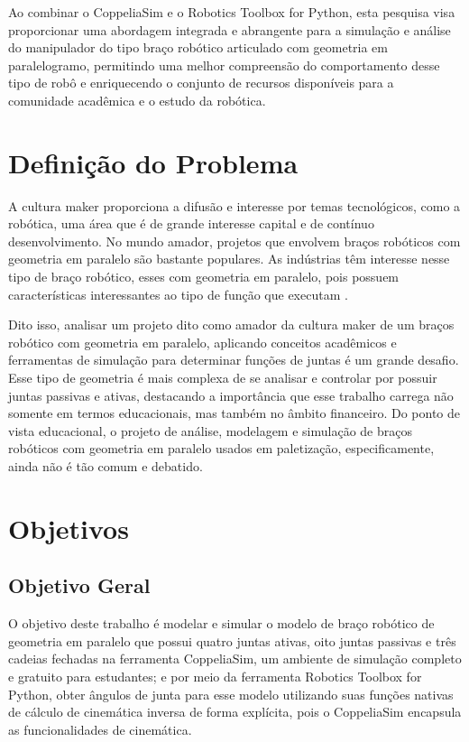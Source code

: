 Ao combinar o CoppeliaSim e o Robotics Toolbox for Python, esta pesquisa visa proporcionar uma abordagem integrada e abrangente para a simulação e análise do manipulador do tipo braço robótico articulado com geometria em paralelogramo,  permitindo uma melhor compreensão do comportamento desse tipo de robô e enriquecendo o conjunto de recursos disponíveis para a comunidade acadêmica e o estudo da robótica.

\section{Definição do Problema}

A cultura maker proporciona a difusão e interesse por temas tecnológicos, como a robótica, uma área que é de grande interesse capital e de contínuo desenvolvimento. No mundo amador, projetos que envolvem braços robóticos com geometria em paralelo são bastante populares. As indústrias têm interesse nesse tipo de braço robótico, esses com geometria em paralelo, pois possuem características interessantes ao tipo de função que executam \cite{Siciliano2009}.

Dito isso, analisar um projeto dito como amador da cultura maker de um braços robótico com geometria em paralelo, aplicando conceitos acadêmicos e ferramentas de simulação para determinar funções de juntas é um grande desafio. Esse tipo de geometria é mais complexa de se analisar e controlar por possuir juntas passivas e ativas, destacando a importância que esse trabalho carrega não somente em termos educacionais, mas também no âmbito financeiro. Do ponto de vista educacional, o projeto de análise, modelagem e simulação de braços robóticos com geometria em paralelo usados em paletização, especificamente, ainda não é tão comum e debatido.


\section{Objetivos}

\subsection{Objetivo Geral} 

O objetivo deste trabalho é modelar e simular o modelo de braço robótico de geometria em paralelo que possui quatro juntas ativas, oito juntas passivas e três cadeias fechadas na ferramenta CoppeliaSim, um ambiente de simulação completo e gratuito para estudantes; e por meio da ferramenta Robotics Toolbox for Python, obter ângulos de junta para esse modelo utilizando suas funções nativas de cálculo de cinemática inversa de forma explícita, pois o CoppeliaSim encapsula as funcionalidades de cinemática.

